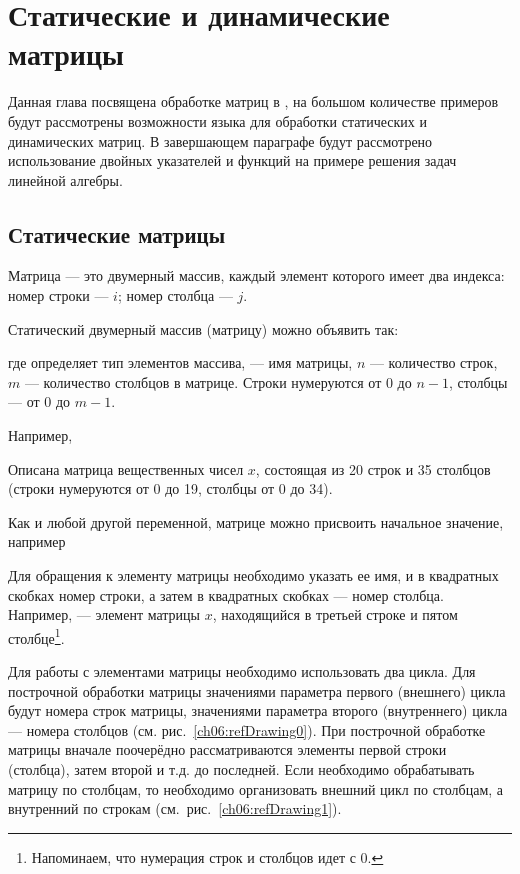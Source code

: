 \chapter[Статические и динамические матрицы]{Статические и динамические матрицы}\label{ch06}
Данная глава посвящена обработке матриц в , на большом количестве примеров будут рассмотрены возможности языка для
обработки статических и динамических матриц. В завершающем параграфе будут рассмотрено использование двойных указателей
и функций на примере решения задач линейной алгебры.

\section[Статические матрицы \Sys{С(С++)}]{Статические матрицы }
Матрица --- это двумерный массив, каждый элемент которого имеет два индекса: номер строки --- $i$; номер столбца --- $j$. 

Статический двумерный массив (матрицу) можно объявить так:


где  определяет тип элементов массива,  --- имя матрицы, $n$ --- количество строк, $m$ --- количество столбцов в матрице. Строки нумеруются от 0 до $n-1$, столбцы --- от 0 до $m-1$.

Например, 


Описана матрица вещественных чисел $x$, состоящая из 20 строк и 35 столбцов 
(строки нумеруются от 0 до 19, столбцы от 0 до 34).

Как и любой другой переменной, матрице можно присвоить начальное значение, например 

Для обращения к элементу матрицы необходимо указать ее имя, и в квадратных скобках номер строки, а затем в квадратных
скобках --- номер столбца. Например,  --- элемент матрицы $x$, находящийся в третьей строке и пятом
столбце\footnote{Напоминаем, что нумерация строк и столбцов идет с 0.}.

Для работы с элементами матрицы необходимо использовать два цикла. Для построчной обработки матрицы значениями параметра
первого (внешнего) цикла будут номера строк матрицы, значениями параметра второго (внутреннего) цикла --- номера столбцов
(см. рис.~\ref{ch06:refDrawing0}). При построчной обработке матрицы вначале поочерёдно рассматриваются элементы первой
строки (столбца), затем второй и т.д. до последней. Если необходимо обрабатывать матрицу по столбцам, то необходимо
организовать внешний цикл по столбцам, а внутренний по строкам (см.~рис.~\ref{ch06:refDrawing1}).

